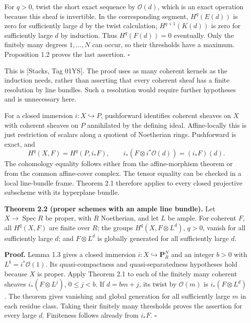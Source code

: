 \documentclass[11pt]{article}
\begin{document}
For \(q>0\), twist the short exact sequence by \(\mathcal O(d)\), which
is an exact operation because this sheaf is invertible. In the
corresponding segment, \(H^q(E(d))\) is zero for sufficiently large
\(d\) by the twist calculation; \(H^{q+1}(K(d))\) is zero for
sufficiently large \(d\) by induction. Thus \(H^q(F(d))=0\) eventually.
Only the finitely many degrees \(1,\ldots,N\) can occur, so their
thresholds have a maximum. Proposition 1.2 proves the last assertion.
\(\square\)

This is {[}Stacks, Tag 01YS{]}. The proof uses as many coherent kernels
as the induction needs, rather than asserting that every coherent sheaf
has a finite resolution by line bundles. Such a resolution would require
further hypotheses and is unnecessary here.

For a closed immersion \(i:X\hookrightarrow P\), pushforward identifies
coherent sheaves on \(X\) with coherent sheaves on \(P\) annihilated by
the defining ideal. Affine-locally this is just restriction of scalars
along a quotient of Noetherian rings. Pushforward is exact, and \[
H^q(X,F)=H^q(P,i_*F),\qquad
i_*(F\otimes i^*\mathcal O(d))=(i_*F)(d).
\] The cohomology equality follows either from the affine-morphism
theorem or from the common affine-cover complex. The tensor equality can
be checked in a local line-bundle frame. Theorem 2.1 therefore applies
to every closed projective subscheme with its hyperplane bundle.

\textbf{Theorem 2.2 (proper schemes with an ample line bundle).} Let
\(X\to\operatorname{Spec}R\) be proper, with \(R\) Noetherian, and let
\(L\) be ample. For coherent \(F\), all \(H^q(X,F)\) are finite over
\(R\); the groups \(H^q(X,F\otimes L^d)\), \(q>0\), vanish for all
sufficiently large \(d\); and \(F\otimes L^d\) is globally generated for
all sufficiently large \(d\).

\textbf{Proof.} Lemma 1.3 gives a closed immersion
\(i:X\hookrightarrow\mathbf P_R^N\) and an integer \(b>0\) with
\(L^b=i^*\mathcal O(1)\). Its quasi-compactness and quasi-separatedness
hypotheses hold because \(X\) is proper. Apply Theorem 2.1 to each of
the finitely many coherent sheaves \(i_*(F\otimes L^j)\), \(0\le j<b\).
If \(d=bm+j\), its twist by \(\mathcal O(m)\) is \(i_*(F\otimes L^d)\).
The theorem gives vanishing and global generation for all sufficiently
large \(m\) in each residue class. Taking their finitely many thresholds
proves the assertion for every large \(d\). Finiteness follows already
from \(i_*F\). \(\square\)
\end{document}
